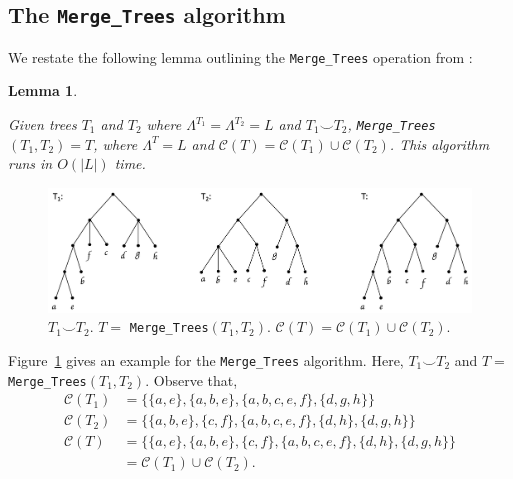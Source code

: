 \documentclass{article}
\newcommand{\compatible}{\smile}
\newcommand{\leafset}{\Lambda}
\newtheorem{mergetrees}[incompatibility]{Lemma}
\begin{document}
    \subsection{The \texttt{Merge\_Trees} algorithm}
    \label{subsec:mergetrees}

    We restate the following lemma outlining the \texttt{Merge\_Trees} operation from \cite{jansson2016improved}:
    \newline

    \begin{mergetrees}
        \label{lem:mergetrees}

        Given trees $T_1$ and $T_2$ where $\leafset^{T_1} = \leafset^{T_2} = L$ and $T_1 \compatible T_2$, \texttt{Merge\_Trees}$(T_1, T_2) = T$, where $\leafset^T = L$ and $\mathcal{C}(T) = \mathcal{C}(T_1) \cup \mathcal{C}(T_2)$. This algorithm runs in $O(|L|)$ time.
    \end{mergetrees}

    \begin{figure}[ht]
        \includegraphics[scale=0.5]{mergetrees}
        \centering
        \caption[The \texttt{Merge\_Trees} algorithm]{$T_1 \compatible T_2$. $T =$ \texttt{Merge\_Trees}$(T_1, T_2)$. $\mathcal{C}(T) = \mathcal{C}(T_1) \cup \mathcal{C}(T_2)$.}
        \label{fig:mergetrees}
    \end{figure}

    Figure~\ref{fig:mergetrees} gives an example for the \texttt{Merge\_Trees} algorithm. Here, $T_1 \compatible T_2$ and $T =$ \texttt{Merge\_Trees}$(T_1, T_2)$. Observe that,
    \begin{align*}
        \mathcal{C}(T_1) &= \{\{a, e\}, \{a, b, e\}, \{a, b, c, e, f\}, \{d, g, h\}\}\\
        \mathcal{C}(T_2) &= \{\{a, b, e\}, \{c, f\}, \{a, b, c, e, f\}, \{d, h\}, \{d, g, h\}\}\\
        \mathcal{C}(T) &= \{\{a, e\}, \{a, b, e\}, \{c, f\}, \{a, b, c, e, f\}, \{d, h\}, \{d, g, h\}\}\\
        &= \mathcal{C}(T_1) \cup \mathcal{C}(T_2).
    \end{align*}
\end{document}
